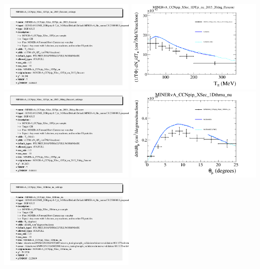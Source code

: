 \documentclass{article}
\begin{document}
\includegraphics[width=0.49\textwidth]{figures/nuisance_MINERvA_CCNpip_XSec_1DTpi_nu_2015_fluxcorr_info.png}
\centering
\includegraphics[width=0.49\textwidth]{figures/nuisance_MINERvA_CCNpip_XSec_1DTpi_nu_2015_20deg_fluxcorr_comp.png}
\includegraphics[width=0.49\textwidth]{figures/nuisance_MINERvA_CCNpip_XSec_1DTpi_nu_2015_20deg_fluxcorr_info.png}
\centering
\includegraphics[width=0.49\textwidth]{figures/nuisance_MINERvA_CCNpip_XSec_1Dthmu_nu_comp.png}
\includegraphics[width=0.49\textwidth]{figures/nuisance_MINERvA_CCNpip_XSec_1Dthmu_nu_info.png}
\end{document}
